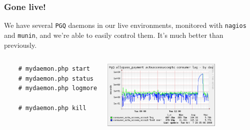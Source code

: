 \documentclass{beamer}
\begin{document}
\begin{frame}[fragile]
  \frametitle{Gone live!}

  We have several \texttt{PGQ} daemons in our live environments, monitored
  with \texttt{nagios} and \texttt{munin}, and we're able to easily control
  them. It's much better than previously.

  \pause

\begin{columns}[c]
  \begin{example}
  \begin{verbatim}
    # mydaemon.php start
    # mydaemon.php status
    # mydaemon.php logmore

    # mydaemon.php kill
  \end{verbatim}
  \end{example}
\begin{center} 
\includegraphics[height=1.3in]{pgq.png}
\end{center} 
\end{columns}
\end{frame}
\end{document}
